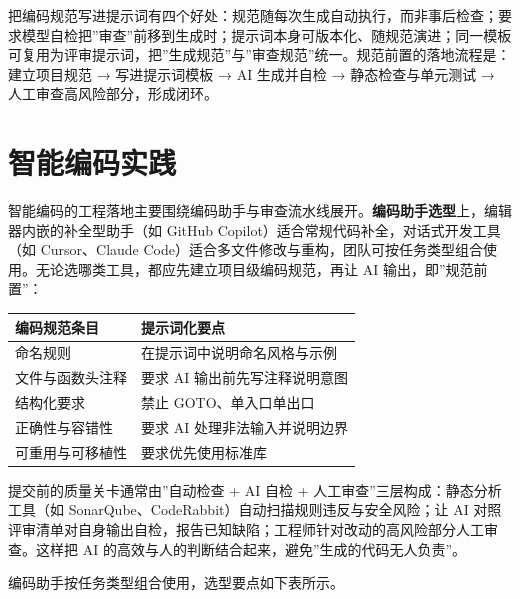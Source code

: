 \documentclass[12pt,a4paper,twoside,openany]{ctexbook}
\numberwithin{figure}{chapter}
\numberwithin{table}{chapter}
\newcounter{none}
\begin{document}
把编码规范写进提示词有四个好处：规范随每次生成自动执行，而非事后检查；要求模型自检把''审查''前移到生成时；提示词本身可版本化、随规范演进；同一模板可复用为评审提示词，把''生成规范''与''审查规范''统一。规范前置的落地流程是：建立项目规范
→ 写进提示词模板 → AI 生成并自检 → 静态检查与单元测试 →
人工审查高风险部分，形成闭环。

\section{智能编码实践}\label{ux667aux80fdux7f16ux7801ux5b9eux8df5}

智能编码的工程落地主要围绕编码助手与审查流水线展开。\textbf{编码助手选型}上，编辑器内嵌的补全型助手（如
GitHub Copilot）适合常规代码补全，对话式开发工具（如 Cursor、Claude
Code）适合多文件修改与重构，团队可按任务类型组合使用。无论选哪类工具，都应先建立项目级编码规范，再让
AI 输出，即''规范前置''：

{\def\LTcaptype{none} %
\begin{longtable}[]{@{}ll@{}}
\toprule\noalign{}
编码规范条目 & 提示词化要点 \\
\midrule\noalign{}
\endhead
\bottomrule\noalign{}
\endlastfoot
命名规则 & 在提示词中说明命名风格与示例 \\
文件与函数头注释 & 要求 AI 输出前先写注释说明意图 \\
结构化要求 & 禁止 GOTO、单入口单出口 \\
正确性与容错性 & 要求 AI 处理非法输入并说明边界 \\
可重用与可移植性 & 要求优先使用标准库 \\
\end{longtable}
}

提交前的质量关卡通常由''自动检查 + AI 自检 +
人工审查''三层构成：静态分析工具（如
SonarQube、CodeRabbit）自动扫描规则违反与安全风险；让 AI
对照评审清单对自身输出自检，报告已知缺陷；工程师针对改动的高风险部分人工审查。这样把
AI 的高效与人的判断结合起来，避免''生成的代码无人负责''。

编码助手按任务类型组合使用，选型要点如下表所示。
\end{document}

